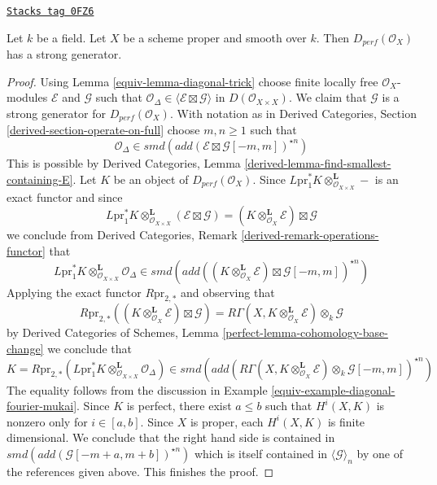 \begin{lemma}
\label{equiv-lemma-smooth-proper-strong-generator}
\href{https://stacks.math.columbia.edu/tag/0FZ6}{\texttt{Stacks tag 0FZ6}}

Let $k$ be a field. Let $X$ be a scheme proper and smooth over $k$.
Then $D_{perf}(\mathcal{O}_X)$
has a strong generator.
\end{lemma}

\begin{proof}

Using Lemma \ref{equiv-lemma-diagonal-trick} choose finite locally free
$\mathcal{O}_X$-modules $\mathcal{E}$ and $\mathcal{G}$ such that
$\mathcal{O}_\Delta \in \langle \mathcal{E} \boxtimes \mathcal{G} \rangle$
in $D(\mathcal{O}_{X \times X})$. We claim that $\mathcal{G}$
is a strong generator for $D_{perf}(\mathcal{O}_X)$. With notation as in
Derived Categories, Section \ref{derived-section-operate-on-full}
choose $m, n \geq 1$ such that
$$
\mathcal{O}_\Delta \in
smd(add(\mathcal{E} \boxtimes \mathcal{G}[-m, m])^{\star n})
$$
This is possible by Derived Categories, Lemma
\ref{derived-lemma-find-smallest-containing-E}.
Let $K$ be an object of $D_{perf}(\mathcal{O}_X)$. Since
$L\text{pr}_1^*K \otimes_{\mathcal{O}_{X \times X}}^\mathbf{L} -$
is an exact functor and since
$$
L\text{pr}_1^*K \otimes_{\mathcal{O}_{X \times X}}^\mathbf{L}
(\mathcal{E} \boxtimes \mathcal{G}) =
(K \otimes_{\mathcal{O}_X}^\mathbf{L} \mathcal{E}) \boxtimes \mathcal{G}
$$
we conclude from
Derived Categories, Remark \ref{derived-remark-operations-functor} that
$$
L\text{pr}_1^*K
\otimes_{\mathcal{O}_{X \times X}}^\mathbf{L}
\mathcal{O}_\Delta
\in
smd(add(
(K \otimes_{\mathcal{O}_X}^\mathbf{L} \mathcal{E})
\boxtimes \mathcal{G}[-m, m])^{\star n})
$$
Applying the exact functor $R\text{pr}_{2, *}$ and observing that
$$
R\text{pr}_{2, *}
\left((K \otimes_{\mathcal{O}_X}^\mathbf{L} \mathcal{E}) \boxtimes
\mathcal{G}\right) =
R\Gamma(X, K \otimes_{\mathcal{O}_X}^\mathbf{L} \mathcal{E})
\otimes_k \mathcal{G}
$$
by Derived Categories of Schemes, Lemma
\ref{perfect-lemma-cohomology-base-change} we conclude that
$$
K = R\text{pr}_{2, *}(L\text{pr}_1^*K
\otimes_{\mathcal{O}_{X \times X}}^\mathbf{L} \mathcal{O}_\Delta)
\in
smd(add(R\Gamma(X, K \otimes_{\mathcal{O}_X}^\mathbf{L} \mathcal{E})
\otimes_k \mathcal{G}[-m, m])^{\star n})
$$
The equality follows from the discussion in
Example \ref{equiv-example-diagonal-fourier-mukai}.
Since $K$ is perfect, there exist $a \leq b$ such that
$H^i(X, K)$ is nonzero only for $i \in [a, b]$. Since $X$ is proper,
each $H^i(X, K)$ is finite dimensional. We conclude that
the right hand side is contained in
$smd(add(\mathcal{G}[-m + a, m + b])^{\star n})$ which is
itself contained in $\langle \mathcal{G} \rangle_n$ by one of the
references given above. This finishes the proof.
\end{proof}

